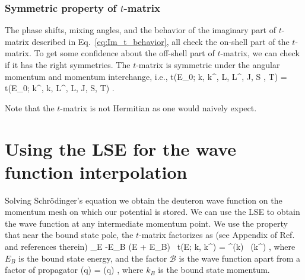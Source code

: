   \subsubsection{Symmetric property of $t$-matrix}

  The phase shifts, mixing angles, and the behavior of the imaginary part of
  $t$-matrix described in Eq.~\eqref{eq:Im_t_behavior}, all check the
  on-shell part of the $t$-matrix.  To get some confidence about the off-shell
  part of $t$-matrix, we can check if it has the right symmetries.
  The $t$-matrix is symmetric under the angular momentum and momentum
  interchange, i.e.,
  \beq
  t(E_0; k, k^\prime, L, L^\prime, J, S , T) = t(E_0; k^\prime, k, L^\prime, L,
  J, S, T) \;.
  \eeq

  Note that the $t$-matrix is not Hermitian as one would naively expect.


  \section{Using the LSE for the wave function interpolation}

  Solving Schr\"{o}dinger's equation we obtain the deuteron wave function
  on the momentum mesh on which our potential is stored.  We can use the LSE
  to obtain the wave function at any intermediate momentum point.
  We use the property that near the bound state pole, the $t$-matrix
  factorizes as (see Appendix of Ref.~\cite{Koenig:2013} and references therein)
  \beq
  \lim_{E \to -E_B} (E + E_B) \, t(E; k, k^\prime) = ^\ast (k) \,
   (k^\prime) \;,
  \label{eq:t_near_pole}
  \eeq
  where $E_B$ is the bound state energy, and the factor $\mathcal{B}$ is
  the wave function apart from a factor of propagator
  \beq
  (q) =  \psi(q) \;,
  \label{eq:B_psi_relation}
  \eeq
  where $k_B$ is the bound state momentum.

